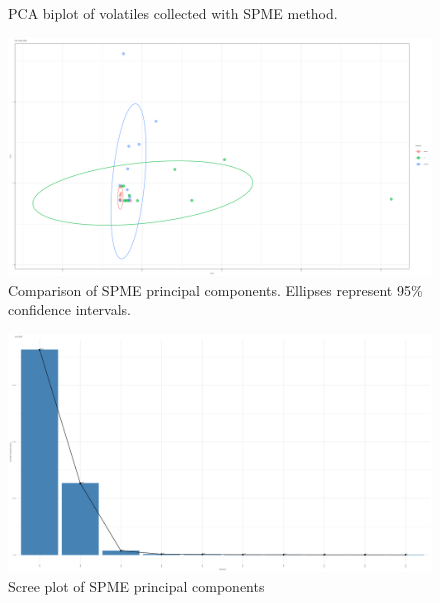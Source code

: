 \documentclass[12pt,final,CPage]{ufthesis}
\begin{document}
{\begin{figure}
{  }

  \caption[PCA biplot of volatiles collected with SPME]{PCA biplot of volatiles collected with SPME method.}\label{fig:spme-vocs}
  \end{figure}
  \begin{figure}

  {\centering \includegraphics[width=1\linewidth]{figure/rrv_volatiles_comparison_pca_comp_spme} 

  }

  \caption[Comparison of SPME principal components]{Comparison of SPME principal components. Ellipses represent 95\% confidence intervals.}\label{fig:spme-vocs-compares}
  \end{figure}
  \begin{figure}

  {\centering \includegraphics[width=1\linewidth]{figure/rrv_volatiles_screeplot_pca_spme} 

  }

  \caption[Scree plot of SPME principal components]{Scree plot of SPME principal components}\label{fig:spme-vocs-scree}
  \end{figure}
  \begin{figure}


\end{figure}}
\end{document}
